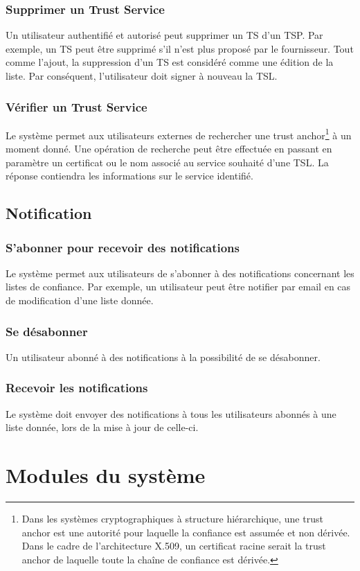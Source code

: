 \documentclass{tnreport}
\begin{document}
\subsubsection{Supprimer un Trust Service}
Un utilisateur authentifié et autorisé peut supprimer un TS d'un TSP. Par exemple, un TS peut être supprimé s'il n'est plus proposé par le fournisseur. Tout comme l'ajout, la suppression d'un TS est considéré comme une édition de la liste. Par conséquent, l'utilisateur doit signer à nouveau la TSL.
\subsubsection{Vérifier un Trust Service}
Le système permet aux utilisateurs externes de rechercher une 
trust anchor\footnote{Dans les systèmes cryptographiques à structure hiérarchique, une trust anchor est une autorité pour laquelle la confiance est assumée et non dérivée. Dans le cadre de l'architecture X.509, un certificat racine serait la trust anchor de laquelle toute la chaîne de confiance est dérivée.} 
à un moment donné. 
Une opération de recherche peut être effectuée en passant en paramètre un certificat ou le nom associé au service souhaité d'une TSL. La réponse contiendra les informations sur le service identifié.

\subsection{Notification}
\subsubsection{S'abonner pour recevoir des notifications}
Le système permet aux utilisateurs de s'abonner à des notifications concernant les listes de confiance. Par exemple, un utilisateur peut être notifier par email en cas de modification d'une liste donnée.
\subsubsection{Se désabonner}
Un utilisateur abonné à des notifications à la possibilité de se désabonner.
\subsubsection{Recevoir les notifications}
Le système doit envoyer des notifications à tous les utilisateurs abonnés à une liste donnée, lors de la mise à jour de celle-ci.

\section{Modules du système}
\end{document}
